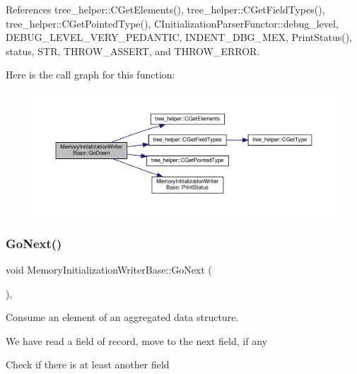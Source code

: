 References tree\+\_\+helper\+::\+C\+Get\+Elements(), tree\+\_\+helper\+::\+C\+Get\+Field\+Types(), tree\+\_\+helper\+::\+C\+Get\+Pointed\+Type(), C\+Initialization\+Parser\+Functor\+::debug\+\_\+level, D\+E\+B\+U\+G\+\_\+\+L\+E\+V\+E\+L\+\_\+\+V\+E\+R\+Y\+\_\+\+P\+E\+D\+A\+N\+T\+IC, I\+N\+D\+E\+N\+T\+\_\+\+D\+B\+G\+\_\+\+M\+EX, Print\+Status(), status, S\+TR, T\+H\+R\+O\+W\+\_\+\+A\+S\+S\+E\+RT, and T\+H\+R\+O\+W\+\_\+\+E\+R\+R\+OR.

Here is the call graph for this function\+:
\nopagebreak
\begin{figure}[H]
\begin{center}
\leavevmode
\includegraphics[width=350pt]{d3/d26/classMemoryInitializationWriterBase_a3ad046983ce9cfe765bcccb7ea16f47f_cgraph}
\end{center}
\end{figure}
\mbox{\label{classMemoryInitializationWriterBase_a6b67daf4f3e0a2ff88bc824c80f11ea6}} 
\subsubsection{\texorpdfstring{Go\+Next()}{GoNext()}}
{\footnotesize\ttfamily void Memory\+Initialization\+Writer\+Base\+::\+Go\+Next (\begin{DoxyParamCaption}{ }\end{DoxyParamCaption})\hspace{0.3cm}{\ttfamily [override]}, {\ttfamily [virtual]}}



Consume an element of an aggregated data structure. 

We have read a field of record, move to the next field, if any

Check if there is at least another field 

